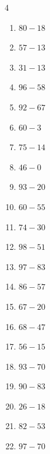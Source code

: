 \begin{multicols}{4}
\begin{enumerate}
  \item $80-18$
        \phantom{$=62$}

  \item $57-13$
        \phantom{$=44$}

  \item $31-13$
        \phantom{$=18$}

  \item $96-58$
        \phantom{$=38$}

  \item $92-67$
        \phantom{$=25$}

  \item $60-3$
        \phantom{$=57$}

  \item $75-14$
        \phantom{$=61$}

  \item $46-0$
        \phantom{$=46$}

\columnbreak %

  \item $93-20$
        \phantom{$=73$}

  \item $60-55$
        \phantom{$=5$}

  \item $74-30$
        \phantom{$=44$}

  \item $98-51$
        \phantom{$=47$}

  \item $97-83$
        \phantom{$=14$}

  \item $86-57$
        \phantom{$=29$}

  \item $67-20$
        \phantom{$=47$}

  \item $68-47$
        \phantom{$=21$}

  \item $56-15$
        \phantom{$=41$}

  \item $93-70$
        \phantom{$=23$}

  \item $90-83$
        \phantom{$=7$}

  \item $26-18$
        \phantom{$=8$}

  \item $82-53$
        \phantom{$=29$}

  \item $97-70$
        \phantom{$=27$}


\end{enumerate}
\end{multicols}
